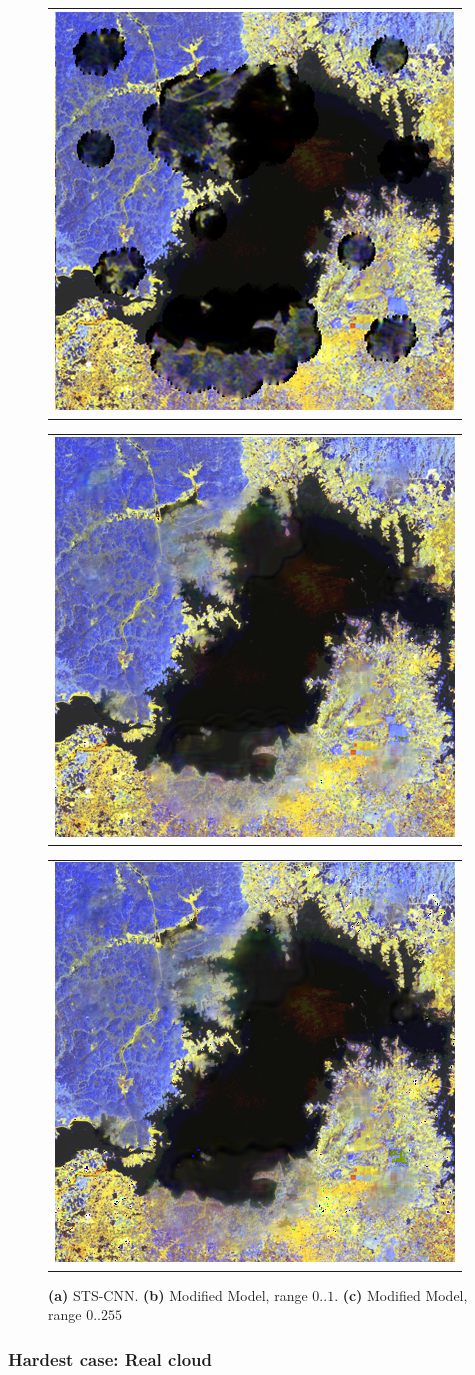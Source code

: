 \begin{figure}[h!]
    \begin{center}
        \begin{tabular}[b]{c}
            \includegraphics[width=0.3\linewidth]{figures/sts_sample_multicloud.png}
          \end{tabular}
          \begin{tabular}[b]{c}
            \includegraphics[width=0.3\linewidth]{figures/1_multiFake.png}
          \end{tabular}
          \begin{tabular}[b]{c}
              \includegraphics[width=0.3\linewidth]{figures/255_multi_fake.png}
          \end{tabular} 
    \end{center}
    \caption{
		\textbf{(a)} STS-CNN.
		\textbf{(b)} Modified Model, range $0..1$.
		\textbf{(c)} Modified Model, range $0..255$}
	\label{fig:improvedModel_experiment_2}
\end{figure}

\subsubsection{Hardest case: Real cloud}

